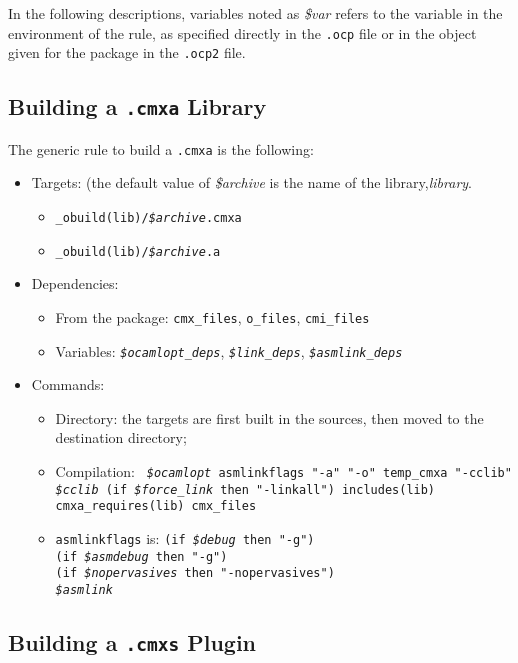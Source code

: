 In the following descriptions, variables noted as {\em \$var} refers
to the variable in the environment of the rule, as specified directly
in the {\tt .ocp} file or in the object given for the package in
the {\tt .ocp2} file.

\subsection{Building a {\tt .cmxa} Library}

The generic rule to build a {\tt .cmxa} is the following:
\begin{itemize}
\item Targets: (the default value of {\em \$archive} is the name of the
  library,{\em library}.
\begin{itemize}
\item {\tt \_obuild(lib)/{\em \$archive}.cmxa}
\item {\tt \_obuild(lib)/{\em \$archive}.a}
\end{itemize}
\item Dependencies:
\begin{itemize}
\item From the package: {\tt cmx\_files}, {\tt o\_files},
  {\tt cmi\_files}
\item Variables: {\tt\em \$ocamlopt\_deps},  {\tt\em \$link\_deps},
      {\tt\em \$asmlink\_deps}
\end{itemize}
\item Commands:
  \begin{itemize}
    \item Directory: the targets are first built in the sources, then
      moved to the destination directory;
    \item Compilation: {\tt
      {\em \$ocamlopt} asmlinkflags "-a" "-o" temp\_cmxa
      "-cclib" {\em \$cclib} (if {\em \$force\_link} then "-linkall")
      includes(lib) cmxa\_requires(lib)  cmx\_files
    }
    \item {\tt asmlinkflags} is:
      {\tt (if {\em \$debug} then "-g")\\
        (if {\em \$asmdebug} then "-g")\\
        (if {\em \$nopervasives} then "-nopervasives")\\
        {\em \$asmlink}}
  \end{itemize} 
\end{itemize}

\subsection{Building a {\tt .cmxs} Plugin}

